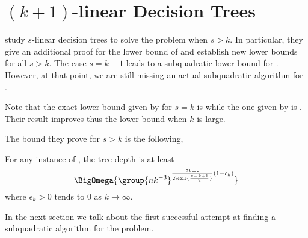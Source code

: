 \section{$(k+1)$-linear Decision Trees}

\citet*{ailon:2005} study $s$-linear decision trees to solve the \kSUM
problem when $s > k$. In particular, they give an additional proof for the
 lower bound of \citet{erickson:1999} and
establish new lower bounds for all $s > k$. The case $s = k+1$ leads to a
subquadratic lower bound for \threeSUM. However, at that point, we are still
missing an actual subquadratic algorithm for \threeSUM.

Note that the exact lower bound given by \citet*{erickson:1999} for \(s = k\) is
 while the one given by
\citet*{ailon:2005} is . Their result
improves thus the lower bound when \(k\) is large.

The bound they prove for \(s > k\) is the following,
\begin{theorem}
For any instance of \kLDT, the tree depth is at least
\begin{displaymath}
\BigOmega{\group{nk^{-3}}^{\frac{2k-s}{2\ceil{\frac{s-k+1}{2}}} (1-\epsilon_k) }}
\end{displaymath}
where \(\epsilon_k > 0\) tends to \(0\) as \(k \to\infty\).
\end{theorem}

In the next section we talk about the first successful attempt at finding
a subquadratic algorithm for the \threeSUM problem.
